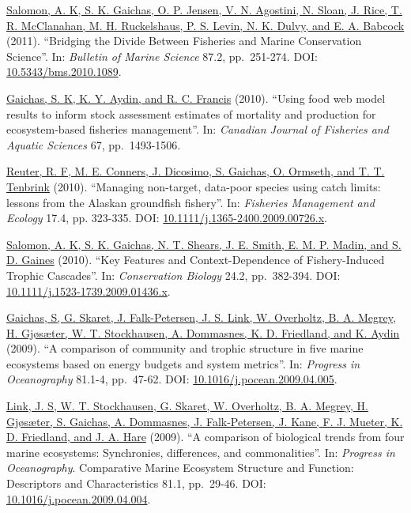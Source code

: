 \documentclass[11pt, a4paper]{awesome-cv}
\begin{document}
\protect\hyperlink{cite-salomon_bridging_2011}{Salomon, A. K, S. K. Gaichas, O.
P. Jensen, V. N. Agostini, N. Sloan, J. Rice, T. R. McClanahan, M. H.
Ruckelshaus, P. S. Levin, N. K. Dulvy, and E. A.
Babcock} (2011). ``Bridging the Divide
Between Fisheries and Marine Conservation Science''. In: \emph{Bulletin of
Marine Science} 87.2, pp.~251-274. DOI:
\href{https://doi.org/10.5343\%2Fbms.2010.1089}{10.5343/bms.2010.1089}.

\protect\hyperlink{cite-gaichas_using_2010}{Gaichas, S. K, K. Y. Aydin, and R.
C. Francis} (2010). ``Using food web model
results to inform stock assessment estimates of mortality and
production for ecosystem-based fisheries management''. In: \emph{Canadian
Journal of Fisheries and Aquatic Sciences} 67, pp.~1493-1506.

\protect\hyperlink{cite-reuter_managing_2010}{Reuter, R. F, M. E. Conners, J.
Dicosimo, S. Gaichas, O. Ormseth, and T. T.
Tenbrink} (2010). ``Managing non-target,
data-poor species using catch limits: lessons from the Alaskan
groundfish fishery''. In: \emph{Fisheries Management and Ecology} 17.4, pp.
323-335. DOI:
\href{https://doi.org/10.1111\%2Fj.1365-2400.2009.00726.x}{10.1111/j.1365-2400.2009.00726.x}.

\protect\hyperlink{cite-salomon_key_2010}{Salomon, A. K, S. K. Gaichas, N. T.
Shears, J. E. Smith, E. M. P. Madin, and S. D.
Gaines} (2010). ``Key Features and
Context-Dependence of Fishery-Induced Trophic Cascades''. In:
\emph{Conservation Biology} 24.2, pp.~382-394. DOI:
\href{https://doi.org/10.1111\%2Fj.1523-1739.2009.01436.x}{10.1111/j.1523-1739.2009.01436.x}.

\protect\hyperlink{cite-gaichas_comparison_2009}{Gaichas, S, G. Skaret, J.
Falk-Petersen, J. S. Link, W. Overholtz, B. A. Megrey, H. Gjøsæter, W.
T. Stockhausen, A. Dommasnes, K. D. Friedland, and K.
Aydin} (2009). ``A comparison of
community and trophic structure in five marine ecosystems based on
energy budgets and system metrics''. In: \emph{Progress in Oceanography}
81.1-4, pp.~47-62. DOI:
\href{https://doi.org/10.1016\%2Fj.pocean.2009.04.005}{10.1016/j.pocean.2009.04.005}.

\protect\hyperlink{cite-link_comparison_2009}{Link, J. S, W. T. Stockhausen, G.
Skaret, W. Overholtz, B. A. Megrey, H. Gjøsæter, S. Gaichas, A.
Dommasnes, J. Falk-Petersen, J. Kane, F. J. Mueter, K. D. Friedland,
and J. A. Hare} (2009). ``A comparison of
biological trends from four marine ecosystems: Synchronies,
differences, and commonalities''. In: \emph{Progress in Oceanography}.
Comparative Marine Ecosystem Structure and Function: Descriptors and
Characteristics 81.1, pp.~29-46. DOI:
\href{https://doi.org/10.1016\%2Fj.pocean.2009.04.004}{10.1016/j.pocean.2009.04.004}.
\end{document}
